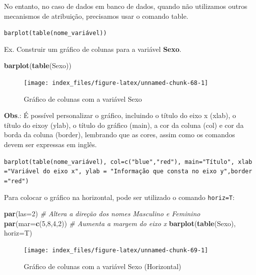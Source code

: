 \documentclass[12pt,brazil,oneside]{book}
\newenvironment{Shaded}{\begin{snugshade}}{\end{snugshade}}
\newcommand{\CommentTok}[1]{\textcolor[rgb]{0.56,0.35,0.01}{\textit{#1}}}
\newcommand{\DataTypeTok}[1]{\textcolor[rgb]{0.13,0.29,0.53}{#1}}
\newcommand{\DecValTok}[1]{\textcolor[rgb]{0.00,0.00,0.81}{#1}}
\newcommand{\KeywordTok}[1]{\textcolor[rgb]{0.13,0.29,0.53}{\textbf{#1}}}
\newcommand{\NormalTok}[1]{#1}
\begin{document}
No entanto, no caso de dados em banco de dados, quando não utilizamos outros mecanismos de atribuição, precisamos usar o comando table.

\texttt{barplot(table(nome\_variável))}

Ex. Construir um gráfico de colunas para a variável \textbf{Sexo}.

\begin{Shaded}
\begin{Highlighting}[]
\KeywordTok{barplot}\NormalTok{(}\KeywordTok{table}\NormalTok{(Sexo))}
\end{Highlighting}
\end{Shaded}

\begin{figure}[H]

{\centering \texttt{[image: index\_files/figure-latex/unnamed-chunk-68-1]} 

}

\caption{Gráfico de colunas com a variável Sexo}\label{fig:unnamed-chunk-68}
\end{figure}

\textbf{Obs}.: É possível personalizar o gráfico, incluindo o título do eixo x (xlab), o título do eixoy (ylab), o título do gráfico (main), a cor da coluna (col) e cor da borda da coluna (border), lembrando que as cores, assim como os comandos devem ser expressas em inglês.

\texttt{barplot(table(nome\_variável),\ col=c("blue","red"),\ main="Título",\ xlab="Variável\ do\ eixo\ x",\ ylab\ =\ "Informação\ que\ consta\ no\ eixo\ y",border="red")}

Para colocar o gráfico na horizontal, pode ser utilizado o comando \texttt{horiz=T}:

\begin{Shaded}
\begin{Highlighting}[]
\KeywordTok{par}\NormalTok{(}\DataTypeTok{las=}\DecValTok{2}\NormalTok{) }\CommentTok{# Altera a direção dos nomes Masculino e Feminino}
\KeywordTok{par}\NormalTok{(}\DataTypeTok{mar=}\KeywordTok{c}\NormalTok{(}\DecValTok{5}\NormalTok{,}\DecValTok{8}\NormalTok{,}\DecValTok{4}\NormalTok{,}\DecValTok{2}\NormalTok{)) }\CommentTok{# Aumenta a margem do eixo x}
\KeywordTok{barplot}\NormalTok{(}\KeywordTok{table}\NormalTok{(Sexo), }\DataTypeTok{horiz=}\NormalTok{T)}
\end{Highlighting}
\end{Shaded}

\begin{figure}[H]

{\centering \texttt{[image: index\_files/figure-latex/unnamed-chunk-69-1]} 

}

\caption{Gráfico de colunas com a variável Sexo (Horizontal)}\label{fig:unnamed-chunk-69}
\end{figure}
\end{document}
